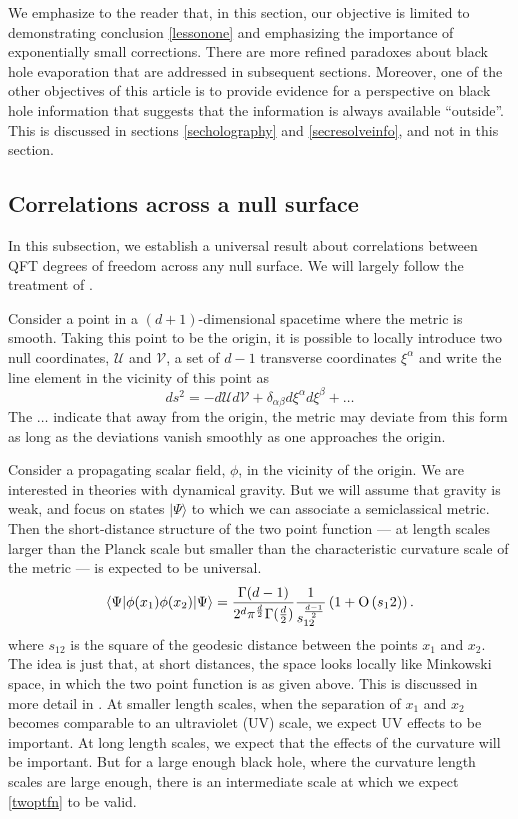 \documentclass[12pt]{article}
\def\Or[#1]{{\text{O}}\left({#1}\right)}
\newcommand{\be}{\begin{equation}}
\newcommand{\ee}{\end{equation}}
\def\uent{\mathcal{U}}
\def\vent{\mathcal{V}}
\def\xent{\mathcal{\xi}}
\begin{document}
We emphasize to the reader that, in this section, our objective is limited to demonstrating conclusion \ref{lessonone} and emphasizing the importance of exponentially small corrections.
There are more refined paradoxes about black hole evaporation that are addressed in subsequent sections. Moreover, one of the other objectives of this article is to provide evidence for a perspective on black hole information that suggests that the information is always available ``outside''.  This is discussed in sections \ref{secholography} and \ref{secresolveinfo},  and not in this section.



\subsection{Correlations across a null surface \label{corrnull}}

In this subsection, we establish a universal result about correlations between QFT degrees of freedom across any null surface. 
We will largely follow the treatment of \cite{Papadodimas:2019msp}.

Consider a point in a $(d+1)$-dimensional spacetime where the metric is smooth. Taking this point to be the origin, it is possible to locally introduce two null coordinates, $\uent$ and $\vent$, a set of $d-1$ transverse coordinates $\xent^{\alpha}$ and write the line element in the vicinity of this point as
\be
\label{nearpatchmetric}
ds^2 = -d \uent d \vent + \delta_{\alpha \beta} d \xent^{\alpha} d \xent^{\beta} + \ldots
\ee
The $\ldots$ indicate that away from the origin, the metric may deviate from this form as long as the deviations vanish smoothly as one approaches the origin. 

Consider a propagating scalar field, $\phi$,  in the vicinity of the origin. We are interested in theories with dynamical gravity. But we will assume  that gravity is weak, and focus on states $|\Psi \rangle$ to which we can associate a semiclassical metric. Then the short-distance structure of the two point function --- at length scales larger than the Planck scale but smaller than the characteristic curvature scale of the metric --- is expected to be universal. 
\be
\label{twoptfn}
\langle \Psi | \phi(x_1) \phi(x_2) | \Psi \rangle = {\Gamma(d-1) \over 2^d \pi^{d \over2} \Gamma({d \over 2})}  {1 \over s_{12}^{d-1 \over 2}}\left(1 + \Or[s_{12}]\right).
\ee
where $s_{12}$ is the square of the geodesic distance between the points $x_1$ and $x_2$. The idea is just that, at short distances, the space looks locally like Minkowski space, in which the two point function is as given above. This is discussed in more detail in \cite{Papadodimas:2019msp}. At smaller length scales, when the separation of $x_1$ and $x_2$ becomes comparable to an ultraviolet (UV) scale, we expect UV effects to be important. At long length scales, we expect that the effects of the curvature will be important. But for a large enough black hole, where the curvature length scales are large enough, there is an intermediate scale at which we expect \eqref{twoptfn} to be valid.
\end{document}
